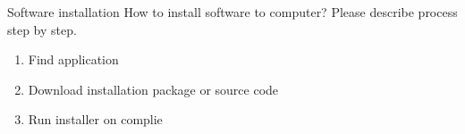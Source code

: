 \begin{frame}{Software installation}
 How to install software to computer? Please describe process step by step. 
\pause
    \begin{enumerate}
        \item Find application 
        \pause
        \item Download installation package or source code
        \pause
        \item Run installer on complie
    \end{enumerate}
\end{frame}

